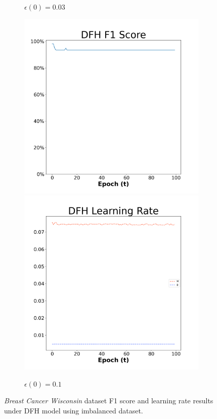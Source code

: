 \begin{figure}[H]
\begin{subfigure}{0.3\textwidth}
  \caption{$\epsilon(0)=0.03$}
\end{subfigure}\hfil %
\begin{subfigure}{0.3\textwidth}
  \includegraphics[width=\linewidth]{images/exper2/breast/DFH_0.1_f1.png}
  \includegraphics[width=\linewidth]{images/exper2/breast/DFH_0.1_lr.png}
  \caption{$\epsilon(0)=0.1$}
\end{subfigure}

\caption{\textit{Breast Cancer Wisconsin} dataset F1 score and learning rate results under DFH model using imbalanced dataset.}
\end{figure}

